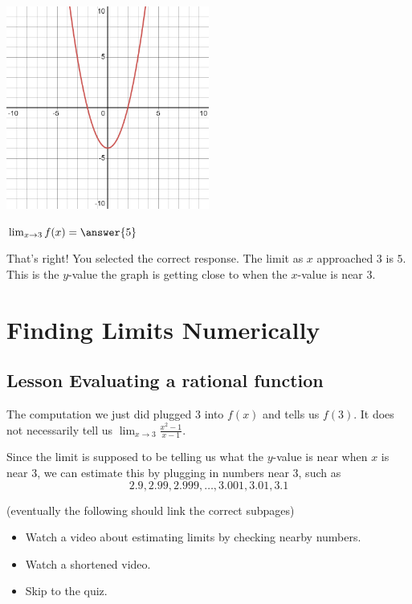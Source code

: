 \documentclass{ximera}
\begin{document}
\includegraphics[width=0.5\textwidth]{graph1.png}
\begin{question}  
$\lim_{x \to 3} f(x) = \answer{5}$  

\begin{explanation}
    That's right! You selected the correct response. The limit as $x$ approached $3$ is $5$. This is the $y$-value the graph is getting close to when the $x$-value is near $3$.
\end{explanation}
\end{question}


\section{Finding Limits Numerically}
\subsection{Lesson Evaluating a rational function}
\begin{center}
\end{center}

The computation we just did plugged 3 into $f(x)$ and tells us $f(3)$. It does not necessarily tell us $\lim_{x \to 3} \frac{x^2-1}{x-1}$.

Since the limit is supposed to be telling us what the $y$-value is near when $x$ is near $3$, we can estimate this by plugging in numbers near $3$, such as
\[
    2.9, 2.99, 2.999, \ldots, 3.001, 3.01, 3.1
\]

(eventually the following should link the correct subpages)
\begin{itemize}
    \item {} Watch a video about estimating limits by checking nearby numbers.
    \item {} Watch a shortened video.
    \item {} Skip to the quiz.
\end{itemize}
\end{document}

